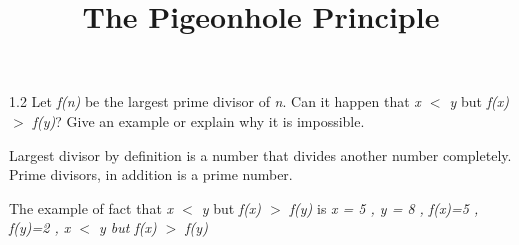 \documentclass{article}
\title{The Pigeonhole Principle}
\date{}
\begin{document}
1.2 Let \emph{f(n)} be the largest prime divisor of \emph{n}. Can it happen that \emph{x $<$ y} but \emph{f(x) $>$ f(y)}? Give an example or explain why it is impossible. \newline

Largest divisor by definition is a number that divides another number completely. Prime divisors, in addition is a prime number. \newline

The example of fact that \emph{x $<$ y} but \emph{f(x) $>$ f(y)} is 
\emph{x = 5 , y = 8 , f(x)=5 , f(y)=2 , x $<$ y but f(x) $>$ f(y) }
\end{document}
